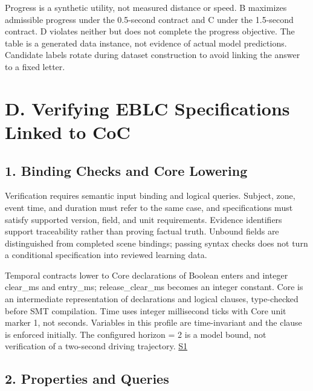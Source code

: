 \documentclass[11pt,a4paper]{article}
\begin{document}
Progress is a synthetic utility, not measured distance or speed. B maximizes admissible progress under the 0.5-second contract and C under the 1.5-second contract. D violates neither but does not complete the progress objective. The table is a generated data instance, not evidence of actual model predictions. Candidate labels rotate during dataset construction to avoid linking the answer to a fixed letter.\par

\section*{D. Verifying EBLC Specifications Linked to CoC}

\subsection*{1. Binding Checks and Core Lowering}

Verification requires semantic input binding and logical queries. Subject, zone, event time, and duration must refer to the same case, and specifications must satisfy supported version, field, and unit requirements. Evidence identifiers support traceability rather than proving factual truth. Unbound fields are distinguished from completed scene bindings; passing syntax checks does not turn a conditional specification into reviewed learning data.\par

Temporal contracts lower to Core declarations of Boolean {\ttfamily\small enters} and integer {\ttfamily\small clear\_ms} and {\ttfamily\small entry\_ms}; {\ttfamily\small release\_clear\_ms} becomes an integer constant. Core is an intermediate representation of declarations and logical clauses, type-checked before SMT compilation. Time uses integer millisecond ticks with Core unit marker {\ttfamily\small 1}, not seconds. Variables in this profile are time-invariant and the clause is enforced initially. The configured {\ttfamily\small horizon = 2} is a model bound, not verification of a two-second driving trajectory. \href{\detokenize{../../../../../../projects/04-guardsynth-coc/experiments/paper1_cnl_learning/temporal_preservation.py}}{S1}\par

\subsection*{2. Properties and Queries}
\end{document}
